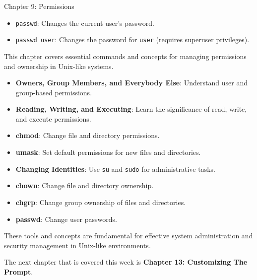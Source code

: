 \begin{notes}{Chapter 9: Permissions}
\begin{highlight}
    \begin{itemize}
        \item \texttt{passwd}: Changes the current user's password.
        \item \texttt{passwd user}: Changes the password for \texttt{user} (requires superuser privileges).
    \end{itemize}
    
    \end{highlight}
    
    \begin{highlight}
    
    This chapter covers essential commands and concepts for managing permissions and ownership in Unix-like systems.
    
    \begin{itemize}
        \item \textbf{Owners, Group Members, and Everybody Else}: Understand user and group-based permissions.
        \item \textbf{Reading, Writing, and Executing}: Learn the significance of read, write, and execute permissions.
        \item \textbf{chmod}: Change file and directory permissions.
        \item \textbf{umask}: Set default permissions for new files and directories.
        \item \textbf{Changing Identities}: Use \texttt{su} and \texttt{sudo} for administrative tasks.
        \item \textbf{chown}: Change file and directory ownership.
        \item \textbf{chgrp}: Change group ownership of files and directories.
        \item \textbf{passwd}: Change user passwords.
    \end{itemize}
    
    These tools and concepts are fundamental for effective system administration and security management in Unix-like environments.
    
    \end{highlight}
\end{notes}

The next chapter that is covered this week is \textbf{Chapter 13: Customizing The Prompt}.

